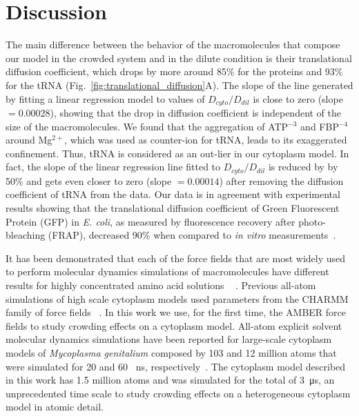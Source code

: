 \documentclass[journal=jacsat,manuscript=article]{achemso}
\begin{document}
  
 
 
 
 
 
 
 
 
 
 
 
 
\section*{Discussion}\label{sec:dissc}


The main difference between the behavior of the macromolecules that compose our model in the crowded system and in the dilute condition is their translational diffusion coefficient, which drops by more around 85\% for the proteins and 93\% for the tRNA (Fig.~\ref{fig:translational_diffusion}A). The slope of the line generated by fitting a linear regression model to values of $D_{cyto}/D_{dil}$ is close to zero (slope $= 0.00028$), showing that the drop in diffusion coefficient is independent of the size of the macromolecules. We found that the aggregation of ATP$^{-3}$ and FBP$^{-4}$ around Mg$^{2+}$, which was used as counter-ion for tRNA, leads to its exaggerated confinement. Thus, tRNA is considered as an out-lier in our cytoplasm model. In fact, the slope of the linear regression line fitted to $D_{cyto}/D_{dil}$ is reduced by by 50\% and gets even closer to zero (slope $= 0.00014$) after removing the diffusion coefficient of tRNA from the data. Our data is in agreement with experimental results showing that the translational diffusion coefficient of Green Fluorescent Protein (GFP) in {\em E. coli}, as measured by fluorescence recovery after photo-bleaching (FRAP), decreased 90\% when compared to {\em in vitro} measurements~\cite{Elowitz1999,Konopka2006}.



It has been demonstrated that each of the force fields that are most widely used to perform molecular dynamics simulations of macromolecules have different results for highly concentrated amino acid solutions ~ \cite{andrews2013molecular}. Previous all-atom simulations of high scale cytoplasm models used parameters from the CHARMM family of force fields ~\cite{yu2016biomolecular,mcguffee2010diffusion}. In this work we use, for the first time, the AMBER force fields to study crowding effects on a cytoplasm model. All-atom explicit solvent molecular dynamics simulations have been reported for large-scale cytoplasm models of \textit{Mycoplasma genitalium} composed by 103 and 12 million atoms that were simulated for 20 and 60 \SI{}{\nano\second}, respectively~\cite{yu2016biomolecular}. The cytoplasm model described in this work has 1.5 million atoms and was simulated for the total of \SI{3}{\micro\second}, an unprecedented time scale to study crowding effects on a heterogeneous cytoplasm model in atomic detail.
\end{document}

